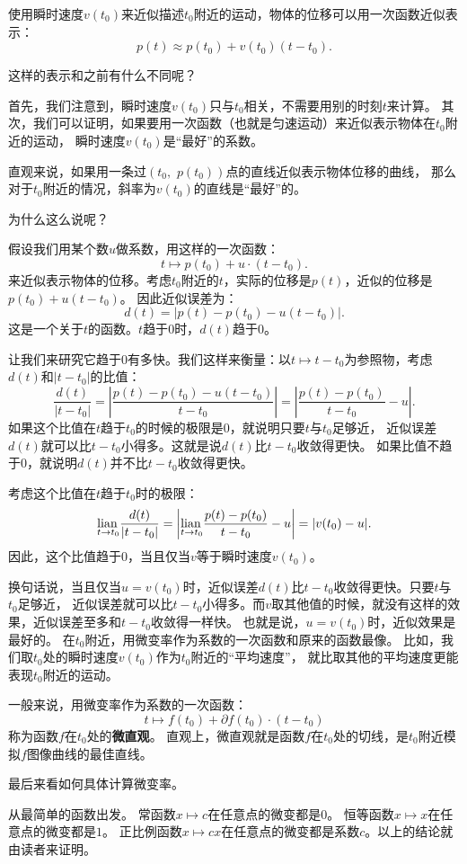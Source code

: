 \documentclass[12pt,UTF8]{ctexbook}
\begin{document}
使用瞬时速度$v(t_0)$来近似描述$t_0$附近的运动，物体的位移可以用一次函数近似表示：
$$ p(t) \approx p(t_0) + v(t_0)(t - t_0).$$

这样的表示和之前有什么不同呢？

首先，我们注意到，瞬时速度$v(t_0)$只与$t_0$相关，不需要用别的时刻$t$来计算。
其次，我们可以证明，如果要用一次函数（也就是匀速运动）来近似表示物体在$t_0$附近的运动，
瞬时速度$v(t_0)$是“最好”的系数。

直观来说，如果用一条过$(t_0, \,\,p(t_0))$点的直线近似表示物体位移的曲线，
那么对于$t_0$附近的情况，斜率为$v(t_0)$的直线是“最好”的。

为什么这么说呢？

假设我们用某个数$u$做系数，用这样的一次函数：
$$ t \mapsto p(t_0) + u\cdot (t - t_0).$$
来近似表示物体的位移。考虑$t_0$附近的$t$，实际的位移是$p(t)$，近似的位移是$p(t_0) + u(t - t_0)$。
因此近似误差为：
$$ d(t) = \left|p(t) - p(t_0) - u(t - t_0)\right|. $$
这是一个关于$t$的函数。$t$趋于$0$时，$d(t)$趋于$0$。

让我们来研究它趋于$0$有多快。我们这样来衡量：以$t\mapsto t - t_0$为参照物，考虑$d(t)$和$|t - t_0|$的比值：
$$ \frac{d(t)}{|t - t_0|} = \left|\frac{p(t) - p(t_0) - u(t - t_0)}{t -  t_0}\right| =  \left|\frac{p(t) - p(t_0)}{t -  t_0} - u\right|. $$
如果这个比值在$t$趋于$t_0$的时候的极限是$0$，就说明只要$t$与$t_0$足够近，
近似误差$d(t)$就可以比$t-t_0$小得多。这就是说$d(t)$比$t-t_0$收敛得更快。
如果比值不趋于$0$，就说明$d(t)$并不比$t-t_0$收敛得更快。

考虑这个比值在$t$趋于$t_0$时的极限：
$$ \underset{t\to t_0}{\operatorname{lian}\,} \frac{d(t)}{|t - t_0|} = \left|\underset{t\to t_0}{\operatorname{lian}\,} \frac{p(t) - p(t_0)}{t -  t_0} - u\right| = |v(t_0) - u|. $$
因此，这个比值趋于$0$，当且仅当$v$等于瞬时速度$v(t_0)$。

换句话说，当且仅当$u = v(t_0)$时，近似误差$d(t)$比$t-t_0$收敛得更快。只要$t$与$t_0$足够近，
近似误差就可以比$t-t_0$小得多。而$v$取其他值的时候，就没有这样的效果，近似误差至多和$t-t_0$收敛得一样快。
也就是说，$u = v(t_0)$时，近似效果是最好的。
在$t_0$附近，用微变率作为系数的一次函数和原来的函数最像。
比如，我们取$t_0$处的瞬时速度$v(t_0)$作为$t_0$附近的“平均速度”，
就比取其他的平均速度更能表现$t_0$附近的运动。

一般来说，用微变率作为系数的一次函数：
$$ t \mapsto f(t_0) + \partial f(t_0) \cdot(t - t_0)$$
称为函数$f$在$t_0$处的\textbf{微直观}。
直观上，微直观就是函数$f$在$t_0$处的切线，是$t_0$附近模拟$f$图像曲线的最佳直线。

最后来看如何具体计算微变率。

从最简单的函数出发。
常函数$x \mapsto c$在任意点的微变都是$0$。
恒等函数$x\mapsto x$在任意点的微变都是$1$。
正比例函数$x \mapsto c x$在任意点的微变都是系数$c$。以上的结论就由读者来证明。
\end{document}
